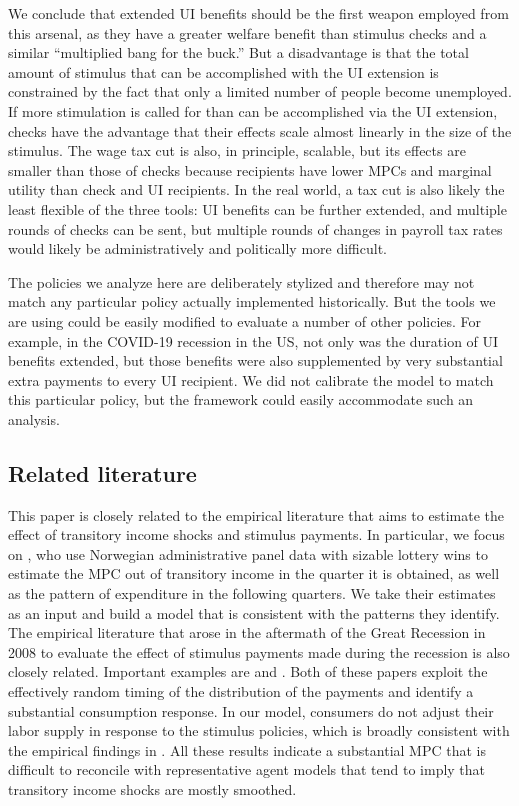 \documentclass[\econtexRoot/HAFiscal]{subfiles}
\begin{document}
We conclude that extended UI benefits should be the first weapon employed from this arsenal, as they have a greater welfare benefit than stimulus checks and a similar ``multiplied bang for the buck.'' But a disadvantage is that the total amount of stimulus that can be accomplished with the UI extension is constrained by the fact that only a limited number of people become unemployed.  If more stimulation is called for than can be accomplished via the UI extension, checks have the advantage that their effects scale almost linearly in the size of the stimulus.  The wage tax cut is also, in principle, scalable, but its effects are smaller than those of checks because recipients have lower MPCs and marginal utility than check and UI recipients.  In the real world, a tax cut is also likely the least flexible of the three tools:  UI benefits can be further extended, and multiple rounds of checks can be sent, but multiple rounds of changes in payroll tax rates would likely be administratively and politically more difficult.

The policies we analyze here are deliberately stylized and therefore may not match any particular policy actually implemented historically.  But the tools we are using could be easily modified to evaluate a number of other policies.  For example, in the COVID-19 recession in the US, not only was the duration of UI benefits extended, but those benefits were also supplemented by very substantial extra payments to every UI recipient.  We did not calibrate the model to match this particular policy, but the framework could easily accommodate such an analysis.

\hypertarget{related-literature}{}\par\subsection{Related literature}
\notinsubfile{\label{sec:lit}}

This paper is closely related to the empirical literature that aims to estimate the effect of transitory income shocks and stimulus payments. In particular, we focus on \cite{fagereng_mpc_2021}, who use Norwegian administrative panel data with sizable lottery wins to estimate the MPC out of transitory income in the quarter it is obtained, as well as the pattern of expenditure in the following quarters. We take their estimates as an input and build a model that is consistent with the patterns they identify. The empirical literature that arose in the aftermath of the Great Recession in 2008 to evaluate the effect of stimulus payments made during the recession is also closely related. Important examples are \cite{parker2013consumer} and \cite{broda2014economic}. Both of these papers exploit the effectively random timing of the distribution of the payments and identify a substantial consumption response. In our model, consumers do not adjust their labor supply in response to the stimulus policies, which is broadly consistent with the empirical findings in \cite{ganong2022spending}. All these results indicate a substantial MPC that is difficult to reconcile with representative agent models that tend to imply that transitory income shocks are mostly smoothed. 
\end{document}

